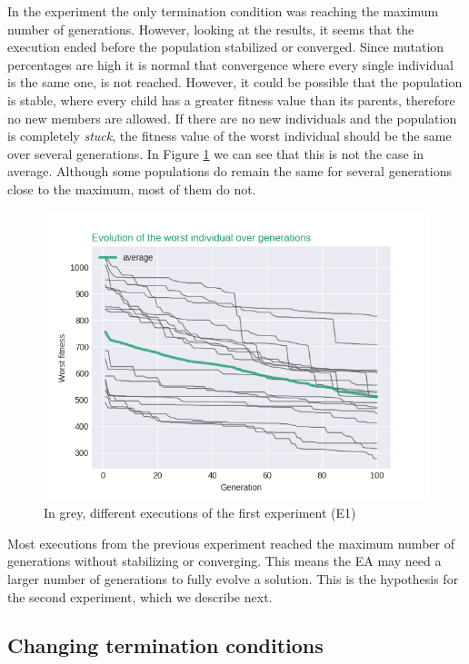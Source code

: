 \documentclass[runningheads,a4paper]{llncs}
\begin{document}
In the experiment the only termination condition was reaching the maximum 
number of generations. However, looking at the results, it seems that the 
execution ended before the population stabilized or converged. Since mutation 
percentages are high it is normal that convergence where every single 
individual is the same one, is not reached. However, it could be possible that 
the population is stable, where every child has a greater fitness value than 
its parents, therefore no new members are allowed. If there are no new 
individuals and the population is completely \textit{stuck}, the fitness value 
of the worst individual should be the same over several generations. In Figure 
\ref{f:grahp1} we can see that this is not the case in average. Although some 
populations do remain the same for several generations close to the maximum, 
most of them do not.

\begin{figure}[H]
	\centering
	\includegraphics[scale=0.55]{exp1_worstIndv.png}
	\caption{In grey, different executions of the first experiment (E1)}\label{f:grahp1}
\end{figure}

Most executions from the previous experiment reached the maximum number of 
generations without stabilizing or converging. This means the EA may need a 
larger number of generations to fully evolve a solution. This is the hypothesis 
for the second experiment, which we describe next.

\subsection{Changing termination conditions}
\end{document}
